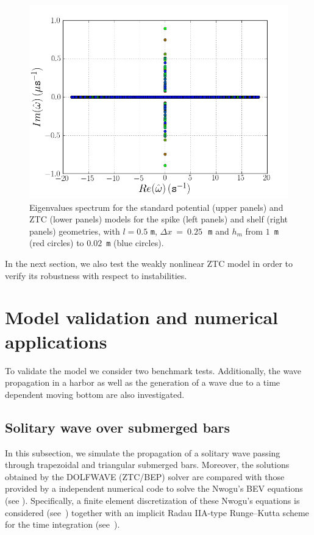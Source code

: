 \begin{figure}
\begin{center}
    \includegraphics[type=png,ext=.png,read=.png,width=\smallfig]{chapters/lopes/png/L_0.5_dx_0.25_hm_shelf_spectrum_Zhao}
  \end{center}
  \caption{Eigenvalues spectrum for the standard potential (upper
    panels) and ZTC (lower panels) models for the spike (left panels) and
    shelf (right panels) geometries, with $l=0.5$ {\tt m}, $\Delta
    x~=~0.25$\,~{\tt m} and $h_m$ from $1$~{\tt m} (red circles) to
    $0.02$~{\tt m} (blue circles).}
  \label{fig:lopes:spectrumhm3}
\end{figure}

In the next section, we also test the weakly nonlinear ZTC model in
order to verify its robustness with respect to instabilities.


\section{Model validation and numerical applications}
\label{sec:lopes:numericaltests}

To validate the model we consider two benchmark tests.  Additionally,
the wave propagation in a harbor as well as the generation of a wave
due to a time dependent moving bottom are also investigated.

\subsection{Solitary wave over  submerged bars}

In this subsection, we simulate the propagation of a solitary wave
passing through trapezoidal and triangular submerged bars.  Moreover,
the solutions obtained by the DOLFWAVE (ZTC/BEP) solver are compared
with those provided by a \fenics independent numerical code to solve
the Nwogu's BEV equations (see ).
Specifically, a finite element discretization of these Nwogu's
equations is considered (see~\citet{Walkley1999}) together with an
implicit Radau IIA-type Runge--Kutta scheme for the time integration
(see~\citet{HairerWanner1991b}).

